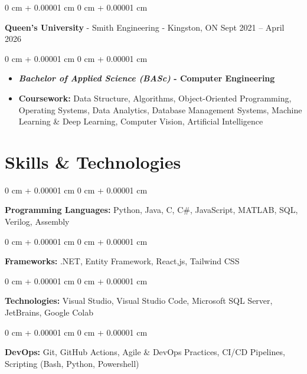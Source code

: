 \documentclass[10pt, letterpaper]{article}
\newenvironment{highlights}{
    \begin{itemize}[
        topsep=0.10 cm,
        parsep=0.10 cm,
        partopsep=0pt,
        itemsep=0pt,
        leftmargin=0 cm + 10pt
    ]
}{
    \end{itemize}
} %
\newenvironment{onecolentry}{
    \begin{adjustwidth}{
        0 cm + 0.00001 cm
    }{
        0 cm + 0.00001 cm
    }
}{
    \end{adjustwidth}
} %
\newenvironment{twocolentry}[2][]{
    \onecolentry
    \def\secondColumn{#2}
    \setcolumnwidth{\fill, 4.5 cm}
    \begin{paracol}{2}
}{
    \switchcolumn \raggedleft \secondColumn
    \end{paracol}
    \endonecolentry
} %
\begin{document}
    \begin{twocolentry}{
        Sept 2021 – April 2026
    }
        \textbf{Queen's University} - Smith Engineering - Kingston, ON\end{twocolentry}

    \vspace{0.10 cm}
    \begin{onecolentry}
        \begin{highlights}
            \item \textbf{\textit{Bachelor of Applied Science (BASc)} - Computer Engineering}
            \item \textbf{Coursework:} Data Structure, Algorithms, Object-Oriented Programming, Operating Systems, Data Analytics, Database Management Systems, Machine Learning \& Deep Learning, Computer Vision, Artificial Intelligence
        \end{highlights}
    \end{onecolentry}

    \section{Skills \& Technologies}
    
    \begin{onecolentry}
        \textbf{Programming Languages:} Python, Java, C, C\#, JavaScript, MATLAB, SQL, Verilog, Assembly
    \end{onecolentry}
    
    \vspace{0.05 cm}
    
    \begin{onecolentry}
        \textbf{Frameworks:} .NET, Entity Framework, React,js, Tailwind CSS
    \end{onecolentry}
    
    \vspace{0.05 cm}
    
    \begin{onecolentry}
        \textbf{Technologies:} Visual Studio, Visual Studio Code, Microsoft SQL Server, JetBrains, Google Colab
    \end{onecolentry}
    
    \begin{onecolentry}
        \textbf{DevOps:} Git, GitHub Actions, Agile \& DevOps Practices, CI/CD Pipelines, Scripting (Bash, Python, Powershell)
    \end{onecolentry}
    
\end{document}
